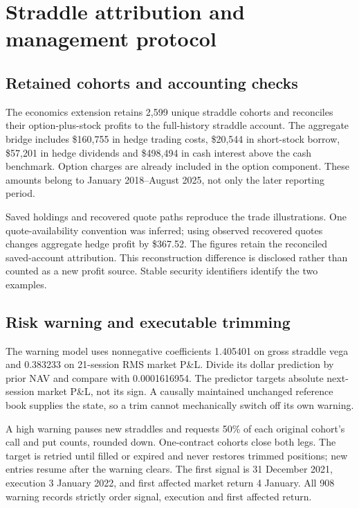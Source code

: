 \clearpage

\section{Straddle attribution and management protocol}\label{app:f}

\subsection*{Retained cohorts and accounting checks}

The economics extension retains 2,599 unique straddle cohorts and reconciles their option-plus-stock profits to the full-history straddle account. The aggregate bridge includes \$160,755 in hedge trading costs, \$20,544 in short-stock borrow, \$57,201 in hedge dividends and \$498,494 in cash interest above the cash benchmark. Option charges are already included in the option component. These amounts belong to January 2018--August 2025, not only the later reporting period.


Saved holdings and recovered quote paths reproduce the trade illustrations. One quote-availability convention was inferred; using observed recovered quotes changes aggregate hedge profit by \$367.52. The figures retain the reconciled saved-account attribution. This reconstruction difference is disclosed rather than counted as a new profit source. Stable security identifiers identify the two examples.


\subsection*{Risk warning and executable trimming}

The warning model uses nonnegative coefficients 1.405401 on gross straddle vega and 0.383233 on 21-session RMS market P\&L. Divide its dollar prediction by prior NAV and compare with 0.0001616954. The predictor targets absolute next-session market P\&L, not its sign. A causally maintained unchanged reference book supplies the state, so a trim cannot mechanically switch off its own warning.


A high warning pauses new straddles and requests 50\% of each original cohort's call and put counts, rounded down. One-contract cohorts close both legs. The target is retried until filled or expired and never restores trimmed positions; new entries resume after the warning clears. The first signal is 31 December 2021, execution 3 January 2022, and first affected market return 4 January. All 908 warning records strictly order signal, execution and first affected return.



